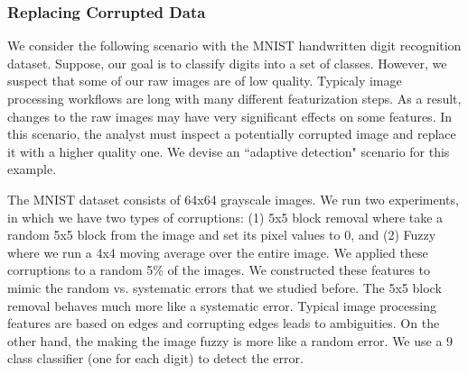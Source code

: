 \subsubsection{Replacing Corrupted Data}
We consider the following scenario with the MNIST handwritten digit recognition dataset.
Suppose, our goal is to classify digits into a set of classes.
However, we suspect that some of our raw images are of low quality.
Typicaly image processing workflows are long with many different featurization steps.
As a result, changes to the raw images may have very significant effects on some features.
In this scenario, the analyst must inspect a potentially corrupted image and replace it with a higher quality one.
We devise an ``adaptive detection" \sys scenario for this example.

The MNIST dataset consists of 64x64 grayscale images.
We run two experiments, in which we have two types of corruptions: (1) 5x5 block removal where take a random 5x5 block from the image and set its pixel values to 0, and (2) Fuzzy where we run a 4x4 moving average over the entire image.
We applied these corruptions to a random 5\% of the images.
We constructed these features to mimic the random vs. systematic errors that we studied before.
The 5x5 block removal behaves much more like a systematic error. 
Typical image processing features are based on edges and corrupting edges leads to ambiguities.
On the other hand, the making the image fuzzy is more like a random error.
We use a 9 class classifier (one for each digit) to detect the error.


